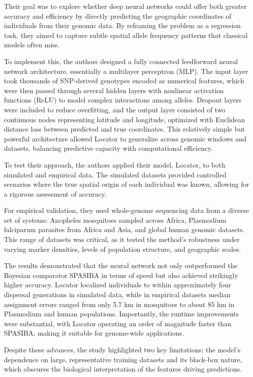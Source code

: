 \documentclass[twocolumn,10pt]{article}
\begin{document}
Their goal was to explore whether deep neural networks could offer both greater accuracy and
efficiency by directly predicting the geographic coordinates of individuals from their genomic data.
By reframing the problem as a regression task, they aimed to capture subtle spatial allele frequency
patterns that classical models often miss.

To implement this, the authors designed a fully connected feedforward neural network architecture,
essentially a multilayer perceptron (MLP). The input layer took thousands of SNP-derived genotypes
encoded as numerical features, which were then passed through several hidden layers with nonlinear
activation functions (ReLU) to model complex interactions among alleles. Dropout layers were
included to reduce overfitting, and the output layer consisted of two continuous nodes representing
latitude and longitude, optimized with Euclidean distance loss between predicted and true
coordinates. This relatively simple but powerful architecture allowed Locator to generalize across
genomic windows and datasets, balancing predictive capacity with computational efficiency.

To test their approach, the authors applied their model, Locator, to both simulated and empirical
data. The simulated datasets provided controlled scenarios where the true spatial origin of each
individual was known, allowing for a rigorous assessment of accuracy.

For empirical validation, they used whole-genome sequencing data from a diverse set of systems:
Anopheles mosquitoes sampled across Africa, Plasmodium falciparum parasites from Africa and Asia,
and global human genomic datasets. This range of datasets was critical, as it tested the method's
robustness under varying marker densities, levels of population structure, and geographic scales.

The results demonstrated that the neural network not only outperformed the Bayesian comparator
SPASIBA in terms of speed but also achieved strikingly higher accuracy. Locator localized
individuals to within approximately four dispersal generations in simulated data, while in empirical
datasets median assignment errors ranged from only 5.7 km in mosquitoes to about 85 km in Plasmodium
and human populations. Importantly, the runtime improvements were substantial, with Locator
operating an order of magnitude faster than SPASIBA, making it suitable for genome-wide
applications.

Despite these advances, the study highlighted two key limitations: the model's dependence on large,
representative training datasets and its black-box nature, which obscures the biological
interpretation of the features driving predictions.
\end{document}
